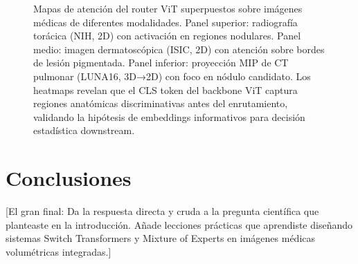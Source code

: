 \documentclass[conference, 11pt]{IEEEtran}
\begin{document}
\begin{figure}[H]
    \centering
    \caption{Mapas de atención del router ViT superpuestos sobre imágenes médicas de diferentes modalidades. Panel superior: radiografía torácica (NIH, 2D) con activación en regiones nodulares. Panel medio: imagen dermatoscópica (ISIC, 2D) con atención sobre bordes de lesión pigmentada. Panel inferior: proyección MIP de CT pulmonar (LUNA16, 3D→2D) con foco en nódulo candidato. Los heatmaps revelan que el CLS token del backbone ViT captura regiones anatómicas discriminativas antes del enrutamiento, validando la hipótesis de embeddings informativos para decisión estadística downstream.}
    \label{fig:heatmaps}
\end{figure}


\section{Conclusiones}
[El gran final: Da la respuesta directa y cruda a la pregunta científica que planteaste en la introducción. Añade lecciones prácticas que aprendiste diseñando sistemas Switch Transformers y Mixture of Experts en imágenes médicas volumétricas integradas.]
\end{document}
